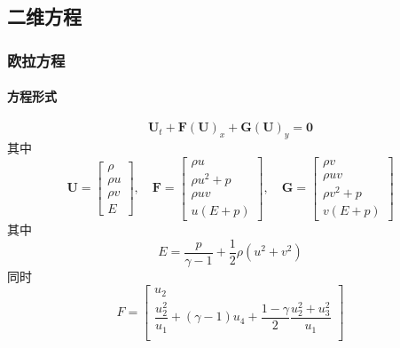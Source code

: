 \documentclass{article}
\numberwithin{equation}{subsection}    %
\begin{document}
\begin{appendix}
    \subsection{二维方程}
    \subsubsection{欧拉方程}
    \paragraph{方程形式}
    \begin{equation}
        \mathbf{U}_{t}+\mathbf{F}(\mathbf{U})_{x}+\mathbf{G}(\mathbf{U})_{y}=\mathbf{0}
    \end{equation}
    其中
    \begin{equation}
        \mathbf{U}=\left[\begin{array}{c}
                \rho   \\
                \rho u \\
                \rho v \\
                E
            \end{array}\right], \quad \mathbf{F}=\left[\begin{array}{c}
                \rho u       \\
                \rho u^{2}+p \\
                \rho u v     \\
                u(E+p)
            \end{array}\right], \quad \mathbf{G}=\left[\begin{array}{c}
                \rho v       \\
                \rho u v     \\
                \rho v^{2}+p \\
                v(E+p)
            \end{array}\right]
    \end{equation}
    其中
    \begin{equation}
        E=\dfrac{p}{\gamma-1}+\dfrac{1}{2} \rho\left(u^{2}+v^{2}\right)
    \end{equation}
    同时
    \begin{equation}
        F = \begin{bmatrix}
            u_2                                                                          \\
            \dfrac{u_2^2}{u_1}+(\gamma-1)u_4+\dfrac{1-\gamma}{2}\dfrac{u_2^2+u_3^2}{u_1} \\

\end{bmatrix}
\end{equation}
\end{appendix}
\end{document}
